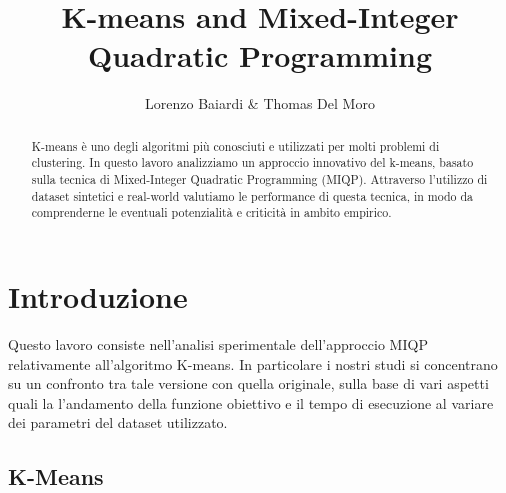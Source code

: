 \documentclass{article}
\title{K-means and Mixed-Integer Quadratic Programming}
\author{Lorenzo Baiardi \& Thomas Del Moro}
\begin{document}
    \maketitle
    \begin{abstract}
        K-means è uno degli algoritmi più conosciuti e utilizzati per molti problemi di clustering. In questo lavoro analizziamo un approccio innovativo del k-means, basato sulla tecnica di Mixed-Integer Quadratic Programming (MIQP). Attraverso l'utilizzo di dataset sintetici e real-world valutiamo le performance di questa tecnica, in modo da comprenderne le
        eventuali potenzialità e criticità in ambito empirico.
    \end{abstract}


    \section{Introduzione}

    Questo lavoro consiste nell'analisi sperimentale dell'approccio MIQP relativamente all'algoritmo K-means. In particolare i nostri studi si concentrano su un confronto tra tale versione con quella originale, sulla base di vari aspetti quali la l'andamento della funzione obiettivo e il tempo di esecuzione al variare dei parametri del dataset utilizzato.

    \subsection{K-Means}
\end{document}
